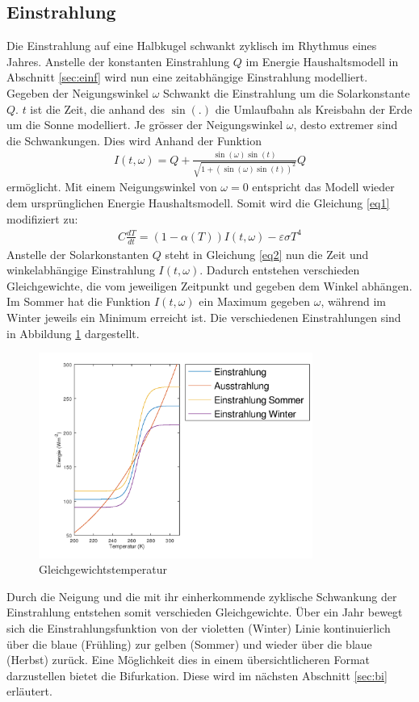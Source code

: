 \begin{refsection}
\subsection{Einstrahlung} \label{sec:einst}
Die Einstrahlung auf eine Halbkugel schwankt zyklisch im Rhythmus
eines Jahres. Anstelle der konstanten Einstrahlung $Q$ im Energie
Haushaltsmodell in Abschnitt \ref{sec:einf} wird nun eine zeitabhängige
Einstrahlung modelliert. Gegeben der Neigungswinkel
$\omega$ Schwankt die Einstrahlung um die Solarkonstante $Q$. $t$
ist die Zeit, die anhand des $\sin(.)$ die Umlaufbahn als Kreisbahn
der Erde um die Sonne modelliert. Je grösser der Neigungswinkel
$\omega$, desto extremer sind die Schwankungen. Dies wird Anhand
der Funktion
\begin{eqnarray*} 
I(t, \omega) = Q+\frac{\sin(\omega)\sin(t)}{\sqrt{1+(\sin(\omega) \sin(t))^2}}Q
\end{eqnarray*}
ermöglicht.  Mit einem Neigungswinkel von $\omega=0$ entspricht das
Modell wieder dem ursprünglichen Energie Haushaltsmodell. Somit
wird die Gleichung \eqref{eq1} modifiziert zu:
\begin{eqnarray} \label{eq2}
C \frac{d T}{d t} = (1-\alpha(T)) I(t, \omega) - \varepsilon \sigma T^4
\end{eqnarray}
Anstelle der Solarkonstanten $Q$ steht in Gleichung \eqref{eq2}
nun die Zeit und winkelabhängige Einstrahlung $I(t,\omega)$. Dadurch
entstehen verschieden Gleichgewichte, die vom jeweiligen Zeitpunkt
und gegeben dem Winkel abhängen. Im Sommer hat die Funktion
$I(t,\omega)$ ein Maximum gegeben $\omega$, während im Winter jeweils
ein Minimum erreicht ist. Die verschiedenen Einstrahlungen sind in
Abbildung \ref{fig:abb7} dargestellt.
%
\begin{figure}
	\centering
	\includegraphics[width= 0.8\textwidth]{neigung/Strahlung_2.png}
	\caption[Gleichgewichtstemperatur]{Gleichgewichtstemperatur}
	\label{fig:abb7}
\end{figure}
Durch die Neigung und die mit ihr einherkommende zyklische Schwankung
der Einstrahlung entstehen somit verschieden Gleichgewichte. Über
ein Jahr bewegt sich die Einstrahlungsfunktion von der violetten
(Winter) Linie kontinuierlich über die blaue (Frühling) zur gelben
(Sommer) und wieder über die blaue (Herbst) zurück. Eine Möglichkeit
dies in einem übersichtlicheren Format darzustellen bietet die
Bifurkation. Diese wird im nächsten Abschnitt \ref{sec:bi} erläutert.



\end{refsection}
